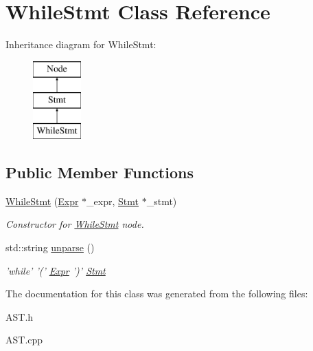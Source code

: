 \hypertarget{classWhileStmt}{\section{While\-Stmt Class Reference}
\label{classWhileStmt}
}
Inheritance diagram for While\-Stmt\-:\begin{figure}[H]
\begin{center}
\leavevmode
\includegraphics[height=3.000000cm]{classWhileStmt}
\end{center}
\end{figure}
\subsection*{Public Member Functions}
\begin{DoxyCompactItemize}
\item 
\hypertarget{classWhileStmt_a8f5b502a2991a0fe944638c30067337f}{\hyperlink{classWhileStmt_a8f5b502a2991a0fe944638c30067337f}{While\-Stmt} (\hyperlink{classExpr}{Expr} $\ast$\-\_\-expr, \hyperlink{classStmt}{Stmt} $\ast$\-\_\-stmt)}\label{classWhileStmt_a8f5b502a2991a0fe944638c30067337f}

\begin{DoxyCompactList}\small\item\em Constructor for \hyperlink{classWhileStmt}{While\-Stmt} node. \end{DoxyCompactList}\item 
\hypertarget{classWhileStmt_acf3bd2eb99735445a3f8b0e2faa27a29}{std\-::string \hyperlink{classWhileStmt_acf3bd2eb99735445a3f8b0e2faa27a29}{unparse} ()}\label{classWhileStmt_acf3bd2eb99735445a3f8b0e2faa27a29}

\begin{DoxyCompactList}\small\item\em 'while' '(' \hyperlink{classExpr}{Expr} ')' \hyperlink{classStmt}{Stmt} \end{DoxyCompactList}\end{DoxyCompactItemize}


The documentation for this class was generated from the following files\-:\begin{DoxyCompactItemize}
\item 
A\-S\-T.\-h\item 
A\-S\-T.\-cpp\end{DoxyCompactItemize}
